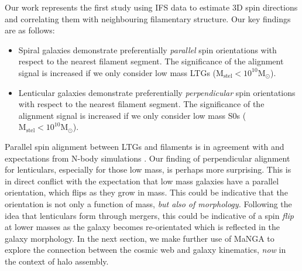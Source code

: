 Our work represents the first study using IFS data to estimate 3D spin directions and correlating them with neighbouring filamentary structure. Our key findings are as follows: 
\begin{itemize}
    \item Spiral galaxies demonstrate preferentially \textit{parallel} spin orientations with respect to the nearest filament segment. The significance of the alignment signal is increased if we only consider low mass LTGs ($\mathrm{M_{stel} < 10^{10} M_{\odot}}$). 
    \item Lenticular galaxies demonstrate preferentially \textit{perpendicular} spin orientations with respect to the nearest filament segment. The significance of the alignment signal is increased if we only consider low mass S0s ($\mathrm{M_{stel} < 10^{10} M_{\odot}}$). 
\end{itemize}

Parallel spin alignment between LTGs and filaments is in agreement with \cite{welker2020} and expectations from N-body simulations \citep[e.g.][]{laigle2015}. Our finding of perpendicular alignment for lenticulars, especially for those low mass, is perhaps more surprising. This is in direct conflict with the expectation that low mass galaxies have a parallel orientation, which flips as they grow in mass. This could be indicative that the orientation is not only a function of mass, \textit{but also of morphology.} Following the idea that lenticulars form through mergers, this could be indicative of a spin \textit{flip} at lower masses as the galaxy becomes re-orientated which is reflected in the galaxy morphology. In the next section, we make further use of MaNGA to explore the connection between the cosmic web and galaxy kinematics, \textit{now} in the context of halo assembly.